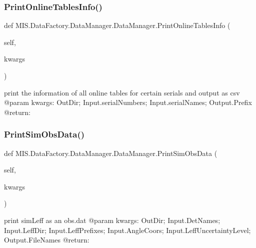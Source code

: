 \subsubsection{\texorpdfstring{Print\+Online\+Tables\+Info()}{PrintOnlineTablesInfo()}}
{\footnotesize\ttfamily def M\+I\+S.\+Data\+Factory.\+Data\+Manager.\+Data\+Manager.\+Print\+Online\+Tables\+Info (\begin{DoxyParamCaption}\item[{}]{self,  }\item[{}]{kwargs }\end{DoxyParamCaption})}

\begin{DoxyVerb}print the information of all online tables for certain serials and output as csv
@param kwargs: OutDir; Input.serialNumbers; Input.serialNames; Output.Prefix
@return:
\end{DoxyVerb}
 \mbox{\label{classMIS_1_1DataFactory_1_1DataManager_1_1DataManager_af3306f7c395fae4954bb68e343d834ec}} 
\subsubsection{\texorpdfstring{Print\+Sim\+Obs\+Data()}{PrintSimObsData()}}
{\footnotesize\ttfamily def M\+I\+S.\+Data\+Factory.\+Data\+Manager.\+Data\+Manager.\+Print\+Sim\+Obs\+Data (\begin{DoxyParamCaption}\item[{}]{self,  }\item[{}]{kwargs }\end{DoxyParamCaption})}

\begin{DoxyVerb}print simLeff as an obs.dat
@param kwargs: OutDir; Input.DetNames; Input.LeffDir; Input.LeffPrefixes; Input.AngleCoors; Input.LeffUncertaintyLevel; Output.FileNames
@return:
\end{DoxyVerb}
 \mbox{\label{classMIS_1_1DataFactory_1_1DataManager_1_1DataManager_a5708bbc93bf8d48003f6da7996c23da8}} 
